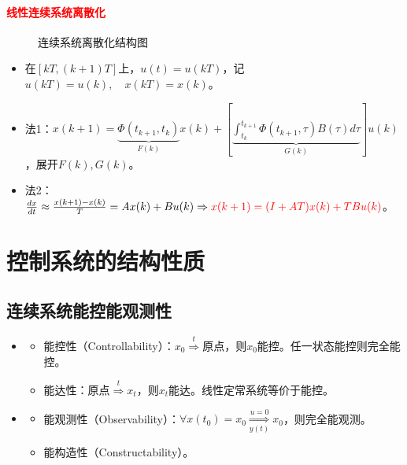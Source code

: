 \documentclass[
12pt, %
a4paper, 
oneside, %
]{scrartcl}
\begin{document}
\paragraph{\textcolor{red}{线性连续系统离散化}}
\begin{figure}[H]
\centering 
{}
\caption{连续系统离散化结构图}
\end{figure}

\begin{itemize}
\item 在$ [kT, (k + 1)T] $上，$ u(t) = u(kT) $，记$ u(kT) = u(k), \quad x(kT) = x(k) $。
\item 法1：$ x(k + 1) = \underbrace{\Phi(t_{k + 1}, t_k)}_{F(k)} x(k) + [\underbrace{\int_{t_k}^{t_{k + 1}} \Phi(t_{k + 1}, \tau) B(\tau) d \tau}_{G(k)}]u(k) $，展开$ F(k), G(k) $。
\item 法2：$ \frac{d x}{d t} \approx \frac{x(k + 1) - x(k)}{T} = A x(k) + B u(k) \Rightarrow \textcolor{red}{x(k + 1) = (I + AT)x(k) + T B u(k)} $。
\end{itemize}
\section{控制系统的结构性质}
\subsection[连续系统能控能观测性]{连续系统能控能观测性}
\begin{itemize}
\item 
\begin{itemize}
\item 能控性（Controllability）：$ x_0 \overset{t}{\Rightarrow} \text{原点} $，则$ x_0 $能控。任一状态能控则完全能控。
\item 能达性：$ \text{原点} \overset{t}{\Rightarrow} x_t $，则$ x_t $能达。线性定常系统等价于能控。
\end{itemize}
\item 
\begin{itemize}
\item 能观测性（Observability）：$ \forall x(t_0) = x_0 \underset{y(t)}{\overset{u = 0}{\Longrightarrow}} x_0 $，则完全能观测。
\item 能构造性（Constructability）。
\end{itemize}
\end{itemize}
\end{document}
